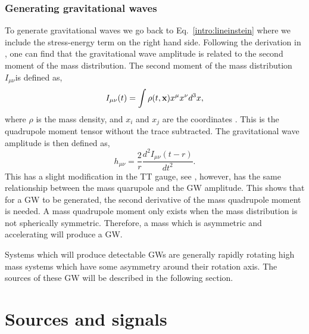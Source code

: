 \subsubsection{Generating gravitational waves}

To generate gravitational waves we go back to Eq.~\ref{intro:lineinstein} where we include the stress-energy term on the right hand side.
Following the derivation in \citep{flanagan2005BasicsGravitational}, one can find that the gravitational wave amplitude is related to the second moment of the mass distribution.
The second moment of the mass distribution $I_{\mu\nu}$is defined as,
\begin{equation}
    I_{\mu \nu}(t) = \int \rho(t,{\bf x}) x^\mu x^\nu d^3x,
\end{equation}
where $\rho$ is the mass density, and $x_i$ and $x_j$ are the coordinates \citep{flanagan2005BasicsGravitational}. 
This is the quadrupole moment tensor without the trace subtracted.
The gravitational wave amplitude is then defined as,
\begin{equation}
\label{intro:gravwave:amp}
    h_{\mu \nu} = \frac{2}{r}  \frac{d^2 I_{\mu \nu}(t-r)}{dt^2}.
\end{equation}
This has a slight modification in the TT gauge, see \citep{flanagan2005BasicsGravitational}, however, has the same relationship between the mass quarupole and the \gls{GW} amplitude.
This shows that for a \gls{GW} to be generated, the second derivative of the mass quadrupole moment is needed.
A mass quadrupole moment only exists when the mass distribution is not spherically symmetric.
Therefore, a mass which is asymmetric and accelerating will produce a \gls{GW}.

Systems which will produce detectable \glspl{GW} are generally rapidly rotating high mass systems which have some asymmetry around their rotation axis.
The sources of these \gls{GW} will be described in the following section.



\section{\label{intro:sources}Sources and signals}

